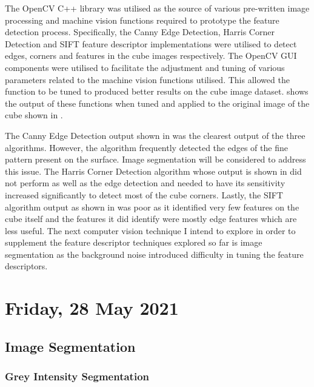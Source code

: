 The OpenCV C++ library was utilised as the source of various pre-written image processing and machine vision functions required to prototype the feature detection process. Specifically, the Canny Edge Detection, Harris Corner Detection and SIFT feature descriptor implementations were utilised to detect edges, corners and features in the cube images respectively. The OpenCV GUI components were utilised to facilitate the adjustment and tuning of various parameters related to the machine vision functions utilised. This allowed the function to be tuned to produced better results on the cube image dataset.  shows the output of these functions when tuned and applied to the original image of the cube shown in .

The Canny Edge Detection output shown in  was the clearest output of the three algorithms. However, the algorithm frequently detected the edges of the fine pattern present on the surface. Image segmentation will be considered to address this issue. The Harris Corner Detection algorithm whose output is shown in  did not perform as well as the edge detection and needed to have its sensitivity increased significantly to detect most of the cube corners. Lastly, the \ac{SIFT} algorithm output as shown in  was poor as it identified very few features on the cube itself and the features it did identify were mostly edge features which are less useful. The next computer vision technique I intend to explore in order to supplement the feature descriptor techniques explored so far is image segmentation as the background noise introduced difficulty in tuning the feature descriptors.

\pendsign

\section[2021/05/28]{Friday, 28 May 2021}

\subsection{Image Segmentation}

\subsubsection{Grey Intensity Segmentation}

